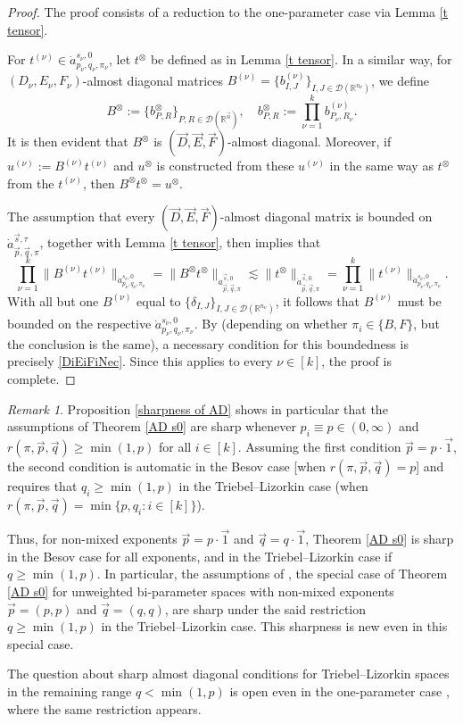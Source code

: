 \documentclass[11pt, reqno]{amsart}
\theoremstyle{definition}
\theoremstyle{remark}
\newtheorem{remark}[theorem]{Remark}
\numberwithin{equation}{section}
\newcommand{\D}{\mathscr D}
\newcommand{\vD}{\vec D}
\newcommand{\vE}{\vec E}
\newcommand{\vF}{\vec F}
\newcommand{\R}{\mathbb R}
\newcommand{\vone}{\vec 1}
\newcommand{\vn}{\vec n}
\newcommand{\vp}{\vec p}
\newcommand{\vq}{\vec q}
\newcommand{\vs}{\vec s}
\newcommand{\atau}{\dot a^{\vs,\tau}_{\vp,\vq,\pi}}
\newcommand{\asn}{\dot a^{\vs,0}_{\vp,\vq,\pi}}
\newcommand{\Norm}[2]{\|#1\|_{#2}}
\begin{document}
\begin{proof}
The proof consists of a reduction to the one-parameter case via Lemma \ref{t tensor}.

For $t^{(\nu)}\in\dot a^{s_\nu,0}_{p_\nu,q_\nu,\pi_\nu}$, let $t^{\otimes}$ be defined as in Lemma \ref{t tensor}. In a similar way, for $(D_\nu,E_\nu,F_\nu)$-almost diagonal matrices $B^{(\nu)}=\{b^{(\nu)}_{I,J}\}_{I,J\in\D(\R^{n_\nu})}$, we define
\begin{equation*}
B^{\otimes}:=\{b^{\otimes}_{P,R}\}_{P,R\in\D(\R^{\vn})},\quad
b^{\otimes}_{P,R}:=\prod_{\nu=1}^k b^{(\nu)}_{P_\nu,R_\nu}.
\end{equation*}
It is then evident that $B^{\otimes}$ is $(\vD,\vE,\vF)$-almost diagonal. Moreover, if $u^{(\nu)}:=B^{(\nu)}t^{(\nu)}$ and $u^{\otimes}$ is constructed from these $u^{(\nu)}$ in the same way as $t^{\otimes}$ from the $t^{(\nu)}$, then $B^{\otimes}t^{\otimes}=u^{\otimes}$.

The assumption that every $(\vD,\vE,\vF)$-almost diagonal matrix is bounded on $\atau$, together with Lemma \ref{t tensor}, then implies that
\begin{equation*}
\prod_{\nu=1}^k\Norm{B^{(\nu)}t^{(\nu)}}{\dot a^{s_\nu,0}_{p_\nu,q_\nu,\pi_\nu}}
=\Norm{B^{\otimes}t^{\otimes}}{\asn}
\lesssim\Norm{t^{\otimes}}{\asn}
=\prod_{\nu=1}^k\Norm{t^{(\nu)}}{\dot a^{s_\nu,0}_{p_\nu,q_\nu,\pi_\nu}}.
\end{equation*}
With all but one $B^{(\nu)}$ equal to $\{\delta_{I,J}\}_{I,J\in\D(\R^{n_\nu})}$, it follows that $B^{(\nu)}$ must be bounded on the respective $\dot a^{s_\nu,0}_{p_\nu,q_\nu,\pi_\nu}$. By \cite[Lemma 7.1 or  9.1]{BHYY:1b} (depending on whether $\pi_i\in\{B,F\}$, but the conclusion is the same), a necessary condition for this boundedness is precisely \eqref{DiEiFiNec}. Since this applies to every $\nu\in[k]$, the proof is complete.
\end{proof}

\begin{remark}
Proposition \ref{sharpness of AD} shows in particular that the assumptions of Theorem \ref{AD s0} are sharp whenever $p_i\equiv p\in(0,\infty)$ and $r(\pi,\vp,\vq)\geq \min(1,p)$ for all $i\in[k]$. Assuming the first condition $\vp=p\cdot\vone$, the second condition is automatic in the Besov case [when $r(\pi,\vp,\vq)=p$] and requires that $q_i\geq\min(1,p)$ in the Triebel--Lizorkin case (when $r(\pi,\vp,\vq)=\min\{p,q_i:i\in[k]\}$).

Thus, for non-mixed exponents $\vp=p\cdot\vone$ and $\vq=q\cdot\vone$, Theorem \ref{AD s0} is sharp in the Besov case for all exponents, and in the Triebel--Lizorkin case if $q\geq\min(1,p)$. In particular, the assumptions of \cite[Theorem 5.2]{GKP21}, the special case of Theorem \ref{AD s0} for unweighted bi-parameter spaces with non-mixed exponents $\vp=(p,p)$ and $\vq=(q,q)$, are sharp under the said restriction $q\geq\min(1,p)$ in the Triebel--Lizorkin case. This sharpness is new even in this special case.

The question about sharp almost diagonal conditions for Triebel--Lizorkin spaces in the remaining range $q<\min(1,p)$ is open even in the one-parameter case \cite{BHYY:1b}, where the same restriction appears.
\end{remark}
\end{document}
